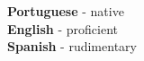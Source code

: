 \documentclass[9pt]{developercv} %
\begin{document}

\begin{minipage}[t]{0.3\textwidth}
	\vspace{-\baselineskip} %

	
	\textbf{Portuguese} - native\\
	\textbf{English} - proficient\\
	\textbf{Spanish} - rudimentary
\end{minipage}
	
	
	
	

\end{document}

